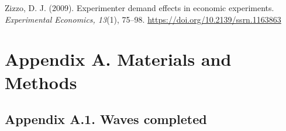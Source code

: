 \documentclass[authordate, empirical]{jote-new-article}
\begin{document}
Zizzo, D. J. (2009). Experimenter demand effects in economic experiments. \emph{Experimental Economics, 13}(1), 75–98. \url{https://doi.org/10.2139/ssrn.1163863}



\clearpage
\onecolumn
\appendix




\renewcommand\thefigure{A.\arabic{figure}}
\renewcommand\thetable{A.\arabic{table}}

\section{Appendix A. Materials and Methods}



\subsection{Appendix A.1. Waves completed}
\end{document}
